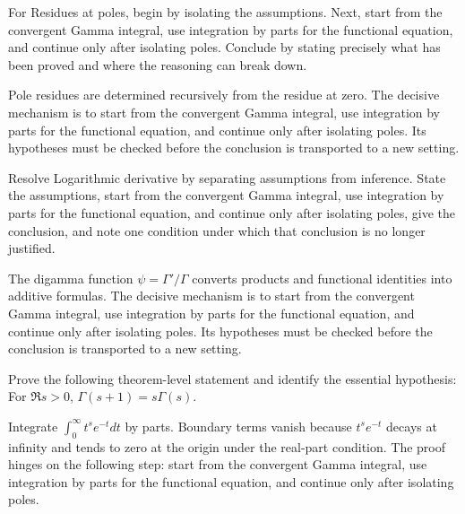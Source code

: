 \begin{problem}\label{prob:iv19-problem-07}
For Residues at poles, begin by isolating the assumptions. Next, start from the convergent Gamma integral, use integration by parts for the functional equation, and continue only after isolating poles. Conclude by stating precisely what has been proved and where the reasoning can break down.
\end{problem}
\begin{solution}
Pole residues are determined recursively from the residue at zero. The decisive mechanism is to start from the convergent Gamma integral, use integration by parts for the functional equation, and continue only after isolating poles. Its hypotheses must be checked before the conclusion is transported to a new setting.
\end{solution}

\begin{problem}\label{prob:iv19-problem-08}
Resolve Logarithmic derivative by separating assumptions from inference. State the assumptions, start from the convergent Gamma integral, use integration by parts for the functional equation, and continue only after isolating poles, give the conclusion, and note one condition under which that conclusion is no longer justified.
\end{problem}
\begin{solution}
The digamma function $\psi=\Gamma'/\Gamma$ converts products and functional identities into additive formulas. The decisive mechanism is to start from the convergent Gamma integral, use integration by parts for the functional equation, and continue only after isolating poles. Its hypotheses must be checked before the conclusion is transported to a new setting.
\end{solution}

\begin{problem}\label{prob:iv19-problem-09}
Prove the following theorem-level statement and identify the essential hypothesis: For $\Re s>0$, $\Gamma(s+1)=s\Gamma(s)$.
\end{problem}
\begin{solution}
Integrate $\int_0^\infty t^s e^{-t}dt$ by parts. Boundary terms vanish because $t^s e^{-t}$ decays at infinity and tends to zero at the origin under the real-part condition. The proof hinges on the following step: start from the convergent Gamma integral, use integration by parts for the functional equation, and continue only after isolating poles.
\end{solution}

